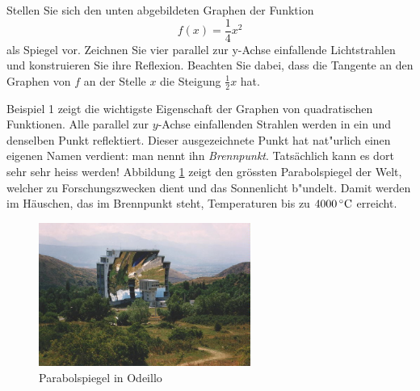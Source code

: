 \documentclass[%
11pt,%
twoside,%
titlepage,%
german,%
headsepline%
]{scrartcl}
\begin{document}
\begin{bsp}
Stellen Sie sich den unten abgebildeten Graphen der Funktion
$$f(x) = \frac{1}{4}x^2$$
als Spiegel vor. Zeichnen Sie vier parallel zur y-Achse einfallende Lichtstrahlen und konstruieren Sie ihre Reflexion. Beachten Sie dabei, dass die Tangente an den Graphen von $f$ an der Stelle $x$ die Steigung $\frac{1}{2}x$ hat.
\begin{figure}
\begin{center}
\end{center}
\end{figure}
\end{bsp}
Beispiel 1 zeigt die wichtigste Eigenschaft der Graphen von quadratischen Funktionen. Alle parallel zur $y$-Achse einfallenden Strahlen werden in ein und denselben Punkt reflektiert. Dieser ausgezeichnete Punkt hat nat"urlich einen eigenen Namen verdient: man nennt ihn
\emph{Brennpunkt}.
Tats\"achlich kann es dort sehr sehr heiss werden! Abbildung \ref{odiello} zeigt den gr\"ossten Parabolspiegel der Welt, welcher zu Forschungszwecken dient und das Sonnenlicht \glqq b"undelt\grqq. Damit werden im H\"auschen, das im Brennpunkt steht, Temperaturen bis zu $\unit[4000]{ ^\circ C}$ erreicht.

\begin{figure}
\begin{center}
\includegraphics[width=0.618\textwidth]{pictures/odeillo}
\end{center}
\caption{Parabolspiegel in Odeillo}\label{odiello} 
\end{figure}
\end{document}
